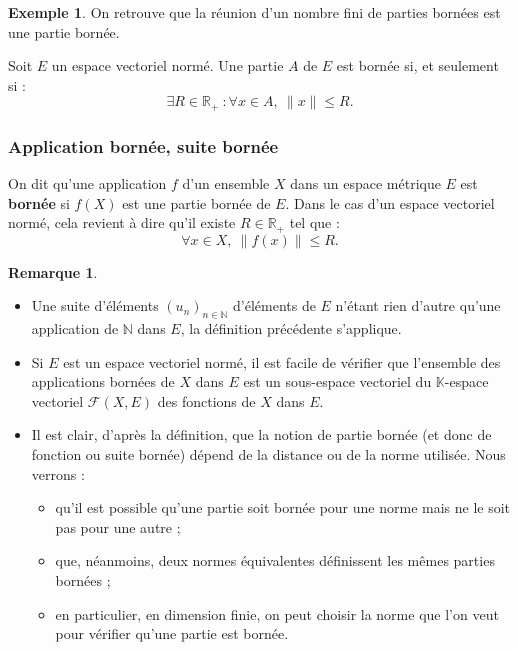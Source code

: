 \documentclass[french]{article}
\newcommand{\N}{\mathbb{N}}
\newcommand{\R}{\mathbb{R}}
\newcommand{\K}{\mathbb{K}}
\theoremstyle{plain}
\theoremstyle{definition}
\newtheorem*{ex}{Exemple}
\newtheorem*{rmq}{Remarque}
\theoremstyle{remark}
\begin{document}
\begin{ex}
	On retrouve que la réunion d'un nombre fini de parties bornées est une partie bornée.
\end{ex}

\begin{cor}%
	Soit $E$ un espace vectoriel normé. Une partie $A$ de $E$ est bornée si, et seulement si : $$\exists R\in\R_+\ : \forall x\in A,\ \lVert x\rVert\leqslant R.$$
\end{cor}

\subsubsection*{Application bornée, suite bornée}

\begin{dfn}
	On dit qu'une application $f$ d'un ensemble $X$ dans un espace métrique $E$ est \textbf{bornée} si $f(X)$ est une partie bornée de $E$. Dans le cas d'un espace vectoriel normé, cela revient à dire qu'il existe $R\in\R_+$ tel que : $$\forall x\in X,\ \lVert f(x)\rVert\leqslant R.$$
\end{dfn}

\begin{rmq}
	\begin{itemize}
		\item Une suite d'éléments $(u_n)_{n\in\N}$ d'éléments de $E$ n'étant rien d'autre qu'une application de $\N$ dans $E$, la définition précédente s'applique.
		\item Si $E$ est un espace vectoriel normé, il est facile de vérifier que l'ensemble des applications bornées de $X$ dans $E$ est un sous-espace vectoriel du $\K$-espace vectoriel $\mathcal{F}(X,E)$ des fonctions de $X$ dans $E$.
		\item Il est clair, d'après la définition, que la notion de partie bornée (et donc de fonction ou suite bornée) dépend de la distance ou de la norme utilisée. Nous verrons :
		\begin{itemize}[label=$\star$]
			\item qu'il est possible qu'une partie soit bornée pour une norme mais ne le soit pas pour une autre ;
			\item que, néanmoins, deux normes équivalentes définissent les mêmes parties bornées ;
			\item en particulier, en dimension finie, on peut choisir la norme que l'on veut pour vérifier qu'une partie est bornée.
		\end{itemize}
	\end{itemize}
\end{rmq}
\end{document}
